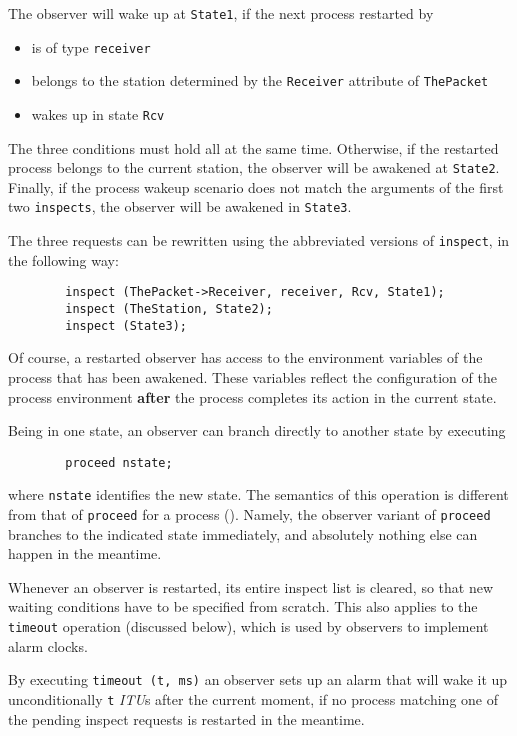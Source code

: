 The observer will wake up at {\tt State1}, if the next process
restarted by \smurph
\begin{itemize}
\item
is of type {\tt receiver}
\item
belongs to the station determined
by the {\tt Receiver} attribute of {\tt ThePacket}
\item
wakes up in state {\tt Rcv}
\end{itemize}
The three conditions must hold all at the same time.
Otherwise, if the restarted process belongs to the
current station, the observer will be awakened at {\tt State2}.
Finally, if the process wakeup scenario does not match
the arguments of the first two {\tt inspects}, the observer will be
awakened in {\tt State3}.

The three requests can be rewritten using the abbreviated versions of
{\tt inspect}, in the following way:
\begin{verbatim}
        inspect (ThePacket->Receiver, receiver, Rcv, State1);
        inspect (TheStation, State2);
        inspect (State3);
\end{verbatim}

\medskip

\noindent
Of course, a restarted observer has access to the environment variables of
the process that has been awakened.
These variables reflect
the configuration of the process environment {\bf after} the process completes
its action in the current state.

Being in one state,
an observer can branch directly to another state by executing
\begin{verbatim}
        proceed nstate;
\end{verbatim}
where {\tt nstate} identifies the new state.
The semantics of this operation is different from that of {\tt proceed}
for a process ().
Namely, the observer variant of
{\tt proceed} branches to the indicated state immediately, and absolutely
nothing else can happen in the meantime.

Whenever an observer is restarted, its entire inspect list is cleared,
so that new waiting conditions have to be specified from scratch.
This also applies to the {\tt timeout} operation (discussed below),
which is used by observers to implement alarm clocks.

By executing
{\tt timeout~(t,~ms)}
an observer sets up an alarm that will wake
it up unconditionally {\tt t} {\em ITU\/}s after the current
moment, if no process matching one of the pending inspect requests
is restarted in the meantime.

